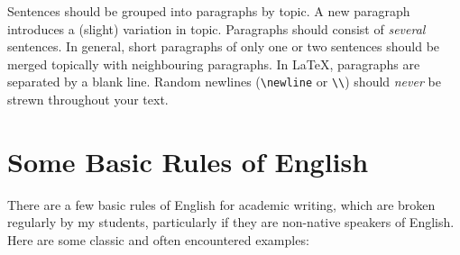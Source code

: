 Sentences should be grouped into paragraphs by topic. A new paragraph
introduces a (slight) variation in topic. Paragraphs should consist of
\emph{several} sentences. In general, short paragraphs of only one or
two sentences should be merged topically with neighbouring paragraphs.
%
In \LaTeX, paragraphs are separated by a blank line. Random newlines
({\smaller\verb|\newline|} or {\smaller\verb|\\|}) should \emph{never}
be strewn throughout your text.






\section{Some Basic Rules of English}

There are a few basic rules of English for academic writing, which are
broken regularly by my students, particularly if they are non-native
speakers of English. Here are some classic and often encountered
examples:


